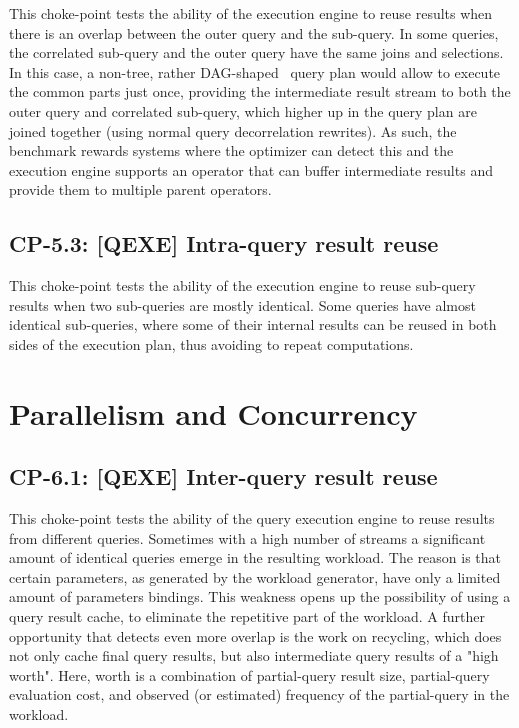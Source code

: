 
This choke-point tests the ability of the execution engine to reuse results when there is an overlap between the outer query and the sub-query. In some queries, the correlated sub-query and the outer query have the same joins and selections.
In this case, a non-tree, rather DAG-shaped~\cite{DBLP:conf/btw/NeumannM09} query plan would allow to execute the common parts just once, providing the intermediate result stream to both the outer query and correlated sub-query,
which higher up in the query plan are joined together (using normal query decorrelation rewrites).
As such, the benchmark rewards systems where the optimizer can detect this and the execution engine supports an operator that can buffer intermediate results and provide them to multiple parent operators.



\subsection*{CP-5.3: [QEXE] Intra-query result reuse}
\label{choke_point_5.3}


This choke-point tests the ability of the execution engine to reuse sub-query results when two sub-queries are mostly identical.
Some queries have almost identical sub-queries, where some of their internal results can be reused in both sides of the execution plan, thus avoiding to repeat computations.




\section{Parallelism and Concurrency}

\subsection*{CP-6.1: [QEXE] Inter-query result reuse}
\label{choke_point_6.1}


This choke-point tests the ability of the query execution engine to reuse results from different queries. Sometimes with a high number of streams a significant amount of identical queries emerge in the resulting workload.
The reason is that certain parameters, as generated by the workload generator, have only a limited amount of parameters bindings.
This weakness opens up the possibility of using a query result cache, to eliminate the repetitive part of the workload.
A further opportunity that detects even more overlap is the work on recycling, which does not only cache final query results, but also intermediate query results of a "high worth".
Here, worth is a combination of partial-query result size, partial-query evaluation cost, and observed (or estimated) frequency of the partial-query in the workload.

